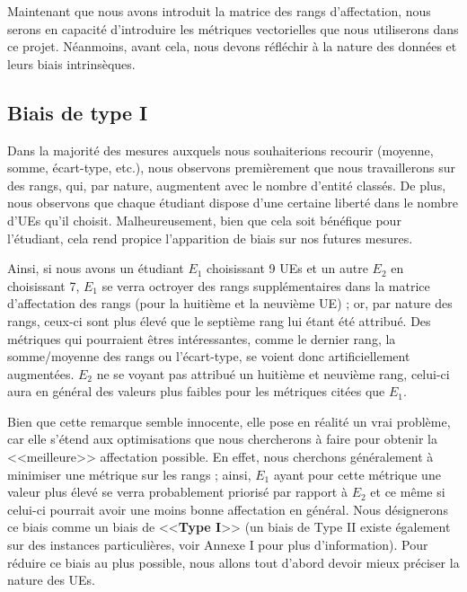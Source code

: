\documentclass{rapport}
\theoremstyle{definition}
\theoremstyle{remark}
\theoremstyle{plain}
\theoremstyle{definition}
\theoremstyle{remark}
\begin{document}
Maintenant que nous avons introduit la matrice des rangs d'affectation, nous serons en capacité d'introduire les métriques vectorielles que nous utiliserons dans ce projet. 
Néanmoins, avant cela, nous devons réfléchir à la nature des données et leurs biais intrinsèques.

\subsection{Biais de type I}
Dans la majorité des mesures auxquels nous souhaiterions recourir (moyenne, somme, écart-type, etc.), nous observons premièrement que nous travaillerons sur des rangs, qui, par nature, augmentent avec le nombre d'entité classés. 
De plus, nous observons que chaque étudiant dispose d'une certaine liberté dans le nombre d'UEs qu'il choisit. Malheureusement, bien que cela soit bénéfique pour l'étudiant, cela rend propice l'apparition de biais sur nos futures mesures.

Ainsi, si nous avons un étudiant $E_1$ choisissant 9 UEs et un autre $E_2$ en choisissant 7, $E_1$ se verra octroyer des rangs supplémentaires dans la matrice d'affectation des rangs (pour la huitième et la neuvième UE) ; or, par nature des rangs, ceux-ci sont plus élevé que le septième rang lui étant été attribué.
Des métriques qui pourraient êtres intéressantes, comme le dernier rang, la somme/moyenne des rangs ou l'écart-type, se voient donc artificiellement augmentées. $E_2$ ne se voyant pas attribué un huitième et neuvième rang, celui-ci aura en général des valeurs plus faibles pour les métriques citées que $E_1$.

Bien que cette remarque semble innocente, elle pose en réalité un vrai problème, car elle s'étend aux optimisations que nous chercherons à faire pour obtenir la <<meilleure>> affectation possible.
En effet, nous cherchons généralement à minimiser une métrique sur les rangs ; ainsi, $E_1$ ayant pour cette métrique une valeur plus élevé se verra probablement priorisé par rapport à $E_2$ et ce même si celui-ci pourrait avoir une moins bonne affectation en général.
Nous désignerons ce biais comme un biais de <<\textbf{Type I}>> (un biais de Type II existe également sur des instances particulières, voir Annexe I pour plus d'information).
Pour réduire ce biais au plus possible, nous allons tout d'abord devoir mieux préciser la nature des UEs.
\end{document}
